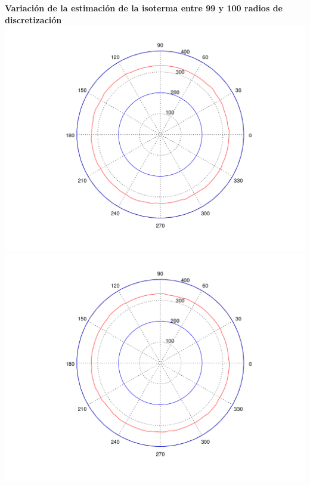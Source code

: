 \begin{enumerate}
 	\textbf{Variación de la estimación de la isoterma entre 99 y 100 radios de discretización}\\
	\includegraphics[scale=0.35]{experimentos1a_1b/evolucion_posicion_isoterma_temperatura/test2/test6_099_radios_inst_001_isomap.png}
	\includegraphics[scale=0.35]{experimentos1a_1b/evolucion_posicion_isoterma_temperatura/test2/test6_100_radios_inst_001_isomap.png}
	

\end{enumerate}
